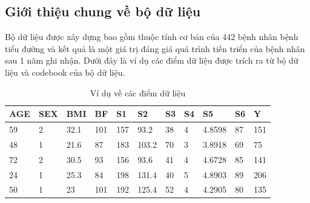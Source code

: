 \documentclass[runningheads]{llncs}
\begin{document}
\subsection{Giới thiệu chung về bộ dữ liệu}
Bộ dữ liệu được xây dựng bao gồm  thuộc tính cơ bản của 442 bệnh nhân bệnh tiểu đường và kết quả là một giá trị đáng giá quá trình tiến triển của bệnh nhân sau 1 năm ghi nhận. Dưới đây là ví dụ các điểm dữ liệu được trích ra từ bộ dữ liệu và codebook của bộ dữ liệu.
\begin{table}
	\setlength{\tabcolsep}{0.5em}
	\renewcommand{\arraystretch}{1.4}
	\begin{center}
		\caption{Ví dụ về các điểm dữ liệu}\label{tab1}
		\begin{tabular}{|p{0.75cm}|p{0.75cm}|p{0.75cm}|p{0.75cm}|p{0.75cm}|p{0.75cm}|p{0.75cm}|p{0.75cm}|p{1cm}|p{0.75cm}|p{0.75cm}|}
			\hline
			\textbf{AGE}&\textbf{SEX}&\textbf{BMI}&\textbf{BF}&\textbf{S1}&\textbf{S2}&\textbf{S3}&\textbf{S4}&\textbf{S5}&\textbf{S6}&\textbf{Y}\\
			\hline
			59&2&32.1&101&157&93.2&38&4&4.8598&87&151\\
			\hline
			48&1&21.6&87&183&103.2&70&3&3.8918&69&75\\
			\hline
			72&2&30.5&93&156&93.6&41&4&4.6728&85&141\\
			\hline
			24&1&25.3&84&198&131.4&40&5&4.8903&89&206\\
			\hline
			50&	1	&23&	101&	192&	125.4&	52&	4&	4.2905&	80&	135\\
			\hline
		\end{tabular}
	\end{center}
\end{table}
\end{document}
